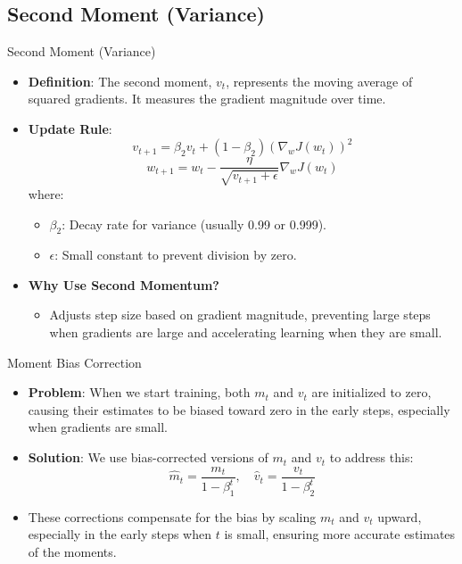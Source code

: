 \documentclass[serif, aspectratio=169]{beamer}
\begin{document}
\subsection{Second Moment (Variance)}
\begin{frame}{Second Moment (Variance)}
    \begin{itemize}
        \item \textbf{Definition}: The second moment, \( v_t \), represents the moving average of squared gradients. It measures the gradient magnitude over time.
        \item \textbf{Update Rule}:
        \[
        v_{t+1} = \beta_2 v_t + (1 - \beta_2) (\nabla_w J(w_t))^2
        \]
        \[
        w_{t+1} = w_t - \frac{\eta}{\sqrt{v_{t+1} + \epsilon}} \nabla_w J(w_t)
        \]
        where:
        \begin{itemize}
            \item \( \beta_2 \): Decay rate for variance (usually 0.99 or 0.999).
            \item \( \epsilon \): Small constant to prevent division by zero.
        \end{itemize}
        \item \textbf{Why Use Second Momentum?}
        \begin{itemize}
            \item Adjusts step size based on gradient magnitude, preventing large steps when gradients are large and accelerating learning when they are small.
        \end{itemize}
    \end{itemize}
\end{frame}

\begin{frame}{Moment Bias Correction}
    \begin{itemize}
        \item \textbf{Problem}: When we start training, both $m_{t}$ and $v_{t}$ are initialized to zero, causing their estimates to be biased toward zero in the early steps, especially when gradients are small.
        \item \textbf{Solution}: We use bias-corrected versions of $m_{t}$ and $v_{t}$ to address this:
        \[\hat{m}_{t} = \frac{m_{t}}{1 - \beta_1^{t}}, \quad 
        \hat{v}_{t} = \frac{v_{t}}{1 -\beta_2^{t}}\]
        \item These corrections compensate for the bias by scaling $m_{t}$ and $v_{t}$ upward, especially in the early steps when $t$ is small, ensuring more accurate estimates of the moments.
    \end{itemize}
\end{frame}
\end{document}
